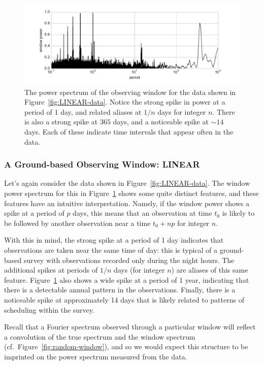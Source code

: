 \documentclass[preprint]{aastex}
\newcommand{\fig}[1]{Figure~\ref{fig:#1}}
\newcommand{\figlabel}[1]{\label{fig:#1}}
\begin{document}
\begin{figure}[ht]
  \centering
  \includegraphics[width=\textwidth]{fig14_LINEAR_window}
  \caption{The power spectrum of the observing window for the data shown
    in \fig{LINEAR-data}. Notice the strong spike in power at a period of
    1 day, and related aliases at $1/n$ days for integer $n$.
    There is also a strong spike at $365$ days, and a noticeable spike at
    $\sim 14$ days. Each of these indicate time intervals that appear often
    in the data.
    \figlabel{LINEAR-window}}
\end{figure}

\subsubsection{A Ground-based Observing Window: LINEAR}

Let's again consider the data shown in \fig{LINEAR-data}. The window power
spectrum for this in \fig{LINEAR-window} shows some quite distinct features,
and these features have an intuitive interpretation.
Namely, if the window power shows a spike at a period of $p$ days, this means
that an observation at time $t_0$ is likely to be followed by another
observation near a time $t_0 + np$ for integer $n$.

With this in mind, the strong spike at a period of 1 day indicates
that observations are
taken near the same time of day: this is typical of a ground-based survey
with observations recorded only during the night hours.
The additional spikes at periods of $1/n$ days (for integer $n$) are aliases
of this same feature.
\fig{LINEAR-window} also shows a wide spike at a period of 1 year, indicating
that there is a detectable annual pattern in the observations.
Finally, there is a noticeable spike at approximately 14 days that is likely
related to patterns of scheduling within the survey.

Recall that a Fourier spectrum observed through a particular window will reflect
a convolution of the true spectrum and the window spectrum
(cf.\ \fig{random-window}), and so we would expect this structure to be
imprinted on the power spectrum measured from the data.
\end{document}
